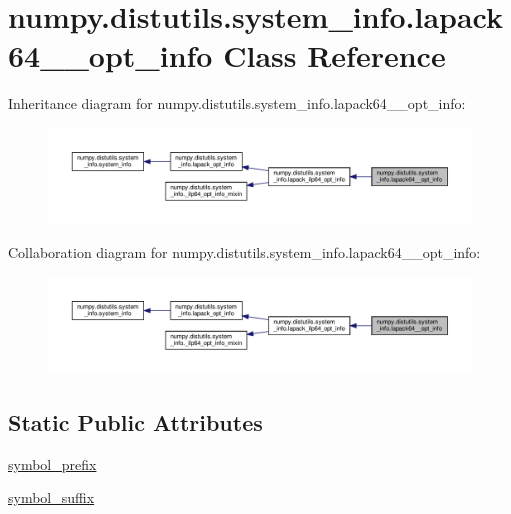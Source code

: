 \hypertarget{classnumpy_1_1distutils_1_1system__info_1_1lapack64____opt__info}{}\section{numpy.\+distutils.\+system\+\_\+info.\+lapack64\+\_\+\+\_\+opt\+\_\+info Class Reference}
\label{classnumpy_1_1distutils_1_1system__info_1_1lapack64____opt__info}


Inheritance diagram for numpy.\+distutils.\+system\+\_\+info.\+lapack64\+\_\+\+\_\+opt\+\_\+info\+:
\nopagebreak
\begin{figure}[H]
\begin{center}
\leavevmode
\includegraphics[width=350pt]{classnumpy_1_1distutils_1_1system__info_1_1lapack64____opt__info__inherit__graph}
\end{center}
\end{figure}


Collaboration diagram for numpy.\+distutils.\+system\+\_\+info.\+lapack64\+\_\+\+\_\+opt\+\_\+info\+:
\nopagebreak
\begin{figure}[H]
\begin{center}
\leavevmode
\includegraphics[width=350pt]{classnumpy_1_1distutils_1_1system__info_1_1lapack64____opt__info__coll__graph}
\end{center}
\end{figure}
\subsection*{Static Public Attributes}
\begin{DoxyCompactItemize}
\item 
\hyperlink{classnumpy_1_1distutils_1_1system__info_1_1lapack64____opt__info_a2f3df09fb33de4fef368720930bf06ad}{symbol\+\_\+prefix}
\item 
\hyperlink{classnumpy_1_1distutils_1_1system__info_1_1lapack64____opt__info_aae9f4bcc9d51b7c6b8bc92f25d48bd28}{symbol\+\_\+suffix}
\end{DoxyCompactItemize}
